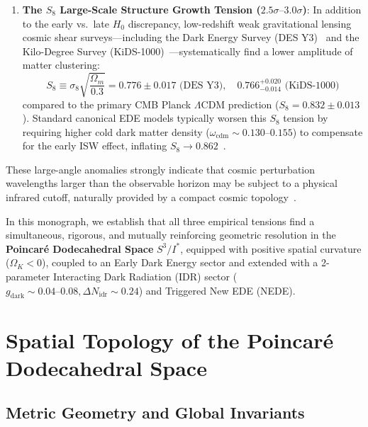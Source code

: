 \documentclass[11pt,a4paper]{article}
\theoremstyle{definition}
\newcommand{\LCDM}{\Lambda\mathrm{CDM}}
\begin{document}
\begin{enumerate}
    \item \textbf{The $S_8$ Large-Scale Structure Growth Tension ($2.5\sigma\text{--}3.0\sigma$)}: In addition to the early vs.\ late $H_0$ discrepancy, low-redshift weak gravitational lensing cosmic shear surveys—including the Dark Energy Survey (DES Y3)~\cite{DES2022} and the Kilo-Degree Survey (KiDS-1000)~\cite{KiDS2021}—systematically find a lower amplitude of matter clustering:
    \begin{equation}
    S_8 \equiv \sigma_8 \sqrt{\frac{\Omega_m}{0.3}} = 0.776 \pm 0.017\text{ (DES Y3)}, \quad 0.766^{+0.020}_{-0.014}\text{ (KiDS-1000)}
    \end{equation}
    compared to the primary CMB Planck $\LCDM$ prediction ($S_8 = 0.832 \pm 0.013$). Standard canonical EDE models typically worsen this $S_8$ tension by requiring higher cold dark matter density ($\omega_{\mathrm{cdm}} \sim 0.130\text{--}0.155$) to compensate for the early ISW effect, inflating $S_8 \to 0.862$~\cite{Hill2020,Hill2022}.
\end{enumerate}

These large-angle anomalies strongly indicate that cosmic perturbation wavelengths larger than the observable horizon may be subject to a physical infrared cutoff, naturally provided by a compact cosmic topology~\cite{Luminet2003,Weeks2004,LachiezeRey1995,Aurich2008}.

In this monograph, we establish that all three empirical tensions find a simultaneous, rigorous, and mutually reinforcing geometric resolution in the \textbf{Poincar\'e Dodecahedral Space} $S^3 / I^*$, equipped with positive spatial curvature ($\Omega_K < 0$), coupled to an Early Dark Energy sector and extended with a 2-parameter Interacting Dark Radiation (IDR) sector ($g_{\mathrm{dark}} \sim 0.04\text{--}0.08, \Delta N_{\mathrm{idr}} \sim 0.24$) and Triggered New EDE (NEDE).

\section{Spatial Topology of the Poincar\'e Dodecahedral Space}

\subsection{Metric Geometry and Global Invariants}
\end{document}
